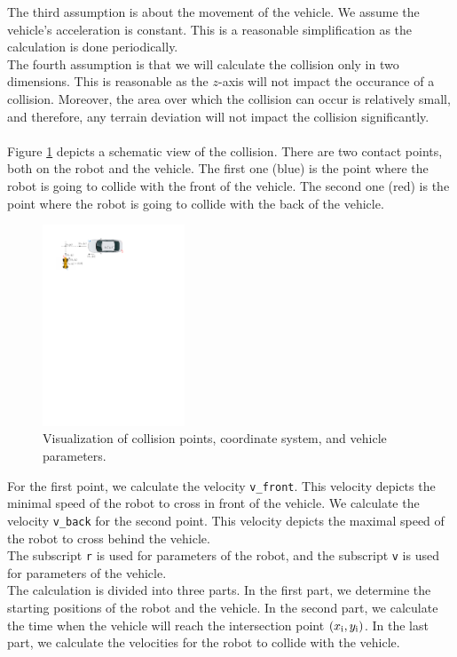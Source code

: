         The third assumption is about the movement of the vehicle. We assume the vehicle's acceleration is constant. This is a reasonable simplification as the calculation is done periodically.\\
        The fourth assumption is that we will calculate the collision only in two dimensions. This is reasonable as the $z$-axis will not impact the occurance of a collision. Moreover, the area over which the collision can occur is relatively small, and therefore, any terrain deviation will not impact the collision significantly.\\\\
        Figure \ref{fig:collision} depicts a schematic view of the collision. There are two contact points, both on the robot and the vehicle. The first one (blue) is the point where the robot is going to collide with the front of the vehicle. The second one (red) is the point where the robot is going to collide with the back of the vehicle.\\
        \begin{figure}[ht]
            \centering
            \includegraphics[height=6cm]{images/collision.pdf}
            \caption{Visualization of collision points, coordinate system, and vehicle parameters.}
            \label{fig:collision}
        \end{figure}
        \noindent For the first point, we calculate the velocity \texttt{v\_front}. This velocity depicts the minimal speed of the robot to cross in front of the vehicle. We calculate the velocity \texttt{v\_back} for the second point. This velocity depicts the maximal speed of the robot to cross behind the vehicle.\\
        The subscript \texttt{r} is used for parameters of the robot, and the subscript \texttt{v} is used for parameters of the vehicle.\\
        The calculation is divided into three parts. In the first part, we determine the starting positions of the robot and the vehicle. In the second part, we calculate the time when the vehicle will reach the intersection point $(x_{\rm{i}}, y_{\rm{i}})$. In the last part, we calculate the velocities for the robot to collide with the vehicle.\\\\
